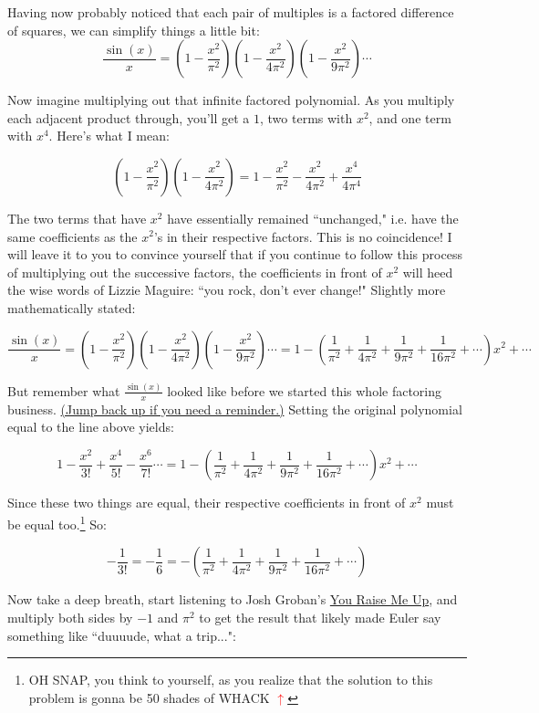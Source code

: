 \documentclass[11pt,titlepage]{article}
\begin{document}
Having now probably noticed that each pair of multiples is a factored difference of squares, we can simplify things a little bit:
$$\frac{\sin(x)}{x} = \left(1-\frac{x^2}{\pi^2}\right)\left(1-\frac{x^2}{4\pi^2}\right)\left(1-\frac{x^2}{9\pi^2}\right)\cdots$$

Now imagine multiplying out that infinite factored polynomial. As you multiply each adjacent product through, you'll get a $1$, two terms with $x^2$, and one term with $x^4$. Here's what I mean:

$$\left(1-\frac{x^2}{\pi^2}\right)\left(1-\frac{x^2}{4\pi^2}\right) = 1 - \frac{x^2}{\pi^2} - \frac{x^2}{4\pi^2}+ \frac{x^4}{4\pi^4}$$

The two terms that have $x^2$ have essentially remained ``unchanged," i.e. have the same coefficients as the $x^2$'s in their respective factors. This is no coincidence! I will leave it to you to convince yourself that if you continue to follow this process of multiplying out the successive factors, the coefficients in front of $x^2$ will heed the wise words of Lizzie Maguire: ``you rock, don't ever change!" Slightly more mathematically stated:

$$\frac{\sin(x)}{x} = \left(1-\frac{x^2}{\pi^2}\right)\left(1-\frac{x^2}{4\pi^2}\right)\left(1-\frac{x^2}{9\pi^2}\right)\cdots = 1 -\left(\frac{1}{\pi^2} + \frac{1}{4\pi^2} + \frac{1}{9\pi^2} + \frac{1}{16\pi^2} + \cdots\right)x^2 + \cdots$$

But remember what $\frac{\sin(x)}{x}$ looked like before we started this whole factoring business. \hyperlink{function}{(Jump back up if you need a reminder.)}  Setting the original polynomial equal to the line above yields:

$$1 - \frac{x^2}{3!} + \frac{x^4}{5!} - \frac{x^6}{7!} \cdots = 1 -\left(\frac{1}{\pi^2} + \frac{1}{4\pi^2} + \frac{1}{9\pi^2} + \frac{1}{16\pi^2}+ \cdots\right)x^2 + \cdots$$

\hypertarget{three}{}Since these two things are equal, their respective coefficients in front of $x^2$ must be equal too.\footnote{OH SNAP, you think to yourself, as you realize that the solution to this problem is gonna be 50 shades of WHACK \hyperlink{three}{\textbf{\textcolor{red}{$\uparrow$}}}} So:

$$-\frac{1}{3!} = -\frac{1}{6} = -\left(\frac{1}{\pi^2} + \frac{1}{4\pi^2} + \frac{1}{9\pi^2} + \frac{1}{16\pi^2}+ \cdots\right)$$

Now take a deep breath, start listening to Josh Groban's \href{http://www.youtube.com/watch?v=aJxrX42WcjQ}{You Raise Me Up}, and multiply both sides by $-1$ and $\pi^2$ to get the result that likely made Euler say something like ``duuuude, what a trip...":
\end{document}
